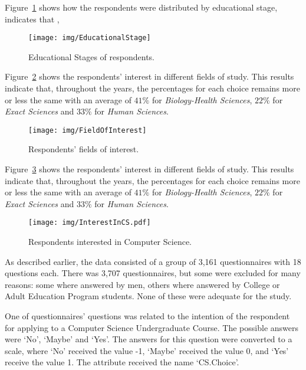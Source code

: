 Figure~\ref{fig:EducationalStage} shows how the respondents were distributed by educational stage, indicates that ,

\begin{figure}%
\texttt{[image: img/EducationalStage]}%
\caption{Educational Stages of respondents.}%
\label{fig:EducationalStage}%
\end{figure}%

Figure~\ref{fig:FieldOfInterest} shows the respondents' interest in different fields of study. This results indicate that, throughout the years, the percentages for each choice remains more or less the same with an average of $41\%$ for \emph{Biology-Health Sciences}, $22\%$ for \emph{Exact Sciences} and $33\%$ for \emph{Human Sciences}.

\begin{figure}%
\texttt{[image: img/FieldOfInterest]}%
\caption{Respondents' fields of interest.}%
\label{fig:FieldOfInterest}%
\end{figure}%

Figure~\ref{fig:InterestInCS.pdf} shows the respondents' interest in different fields of study. This results indicate that, throughout the years, the percentages for each choice remains more or less the same with an average of $41\%$ for \emph{Biology-Health Sciences}, $22\%$ for \emph{Exact Sciences} and $33\%$ for \emph{Human Sciences}.

\begin{figure}%
\texttt{[image: img/InterestInCS.pdf]}%
\caption{Respondents interested in Computer Science.}%
\label{fig:InterestInCS.pdf}%
\end{figure}%

As described earlier, the data consisted of a group of 3,161 questionnaires with 18 questions each. There was 3,707 questionnaires, but some were excluded for many reasons: some where answered by men, others where answered by College or Adult Education Program students. None of these were adequate for the study. 

One of questionnaires' questions was related to the intention of the respondent for applying to a Computer Science Undergraduate Course. The possible answers were `No', `Maybe' and `Yes'. The answers for this question were converted to a scale, where `No' received the value -1, `Maybe' received the value 0, and `Yes' receive the value 1. The attribute received the name `CS.Choice'.

